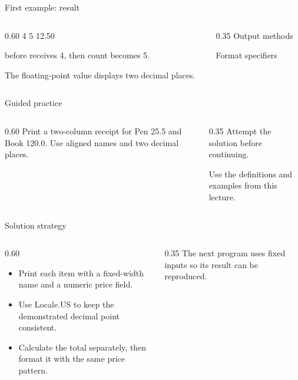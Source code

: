 \documentclass[10pt,aspectratio=169]{beamer}
\begin{document}
\begin{frame}[fragile,t]{First example: result}
\begin{columns}[T,onlytextwidth]\begin{column}{0.60\textwidth}
4 5 12.50\par before receives 4, then count becomes 5.\par The floating-point value displays two decimal places.
\end{column}\begin{column}{0.35\textwidth}\small
Output methods

Format specifiers
\end{column}\end{columns}
\end{frame}

\begin{frame}[fragile,t]{Guided practice}
\begin{columns}[T,onlytextwidth]\begin{column}{0.60\textwidth}
Print a two-column receipt for Pen 25.5 and Book 120.0. Use aligned names and two decimal places.
\end{column}\begin{column}{0.35\textwidth}\small
Attempt the solution before continuing.

Use the definitions and examples from this lecture.
\end{column}\end{columns}
\end{frame}

\begin{frame}[fragile,t]{Solution strategy}
\begin{columns}[T,onlytextwidth]\begin{column}{0.60\textwidth}
\begin{itemize}
\item Print each item with a fixed-width name and a numeric price field.
\item Use Locale.US to keep the demonstrated decimal point consistent.
\item Calculate the total separately, then format it with the same price pattern.
\end{itemize}
\end{column}\begin{column}{0.35\textwidth}\small
The next program uses fixed inputs so its result can be reproduced.
\end{column}\end{columns}
\end{frame}
\end{document}
